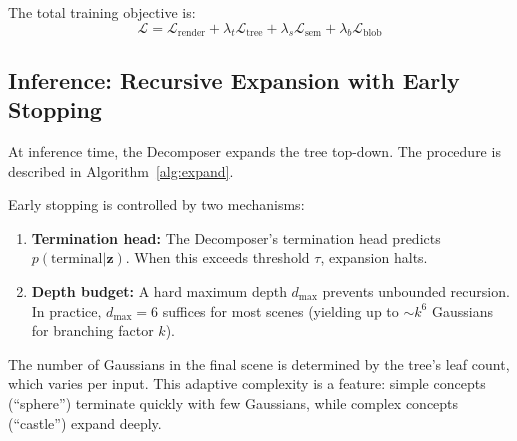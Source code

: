 \documentclass[11pt]{article}
\begin{document}
The total training objective is:
\begin{equation}
\mathcal{L} = \mathcal{L}_{\text{render}} + \lambda_t \mathcal{L}_{\text{tree}} + \lambda_s \mathcal{L}_{\text{sem}} + \lambda_b \mathcal{L}_{\text{blob}}
\end{equation}

\subsection{Inference: Recursive Expansion with Early Stopping}

At inference time, the Decomposer expands the tree top-down. The procedure is described in Algorithm~\ref{alg:expand}.

\begin{algorithm}[ht]
\caption{Recursive Tree Expansion}
\label{alg:expand}
\end{algorithm}

Early stopping is controlled by two mechanisms:

\begin{enumerate}
    \item \textbf{Termination head:} The Decomposer's termination head predicts $p(\text{terminal} | \mathbf{z})$. When this exceeds threshold $\tau$, expansion halts.
    \item \textbf{Depth budget:} A hard maximum depth $d_{\max}$ prevents unbounded recursion. In practice, $d_{\max} = 6$ suffices for most scenes (yielding up to $\sim k^6$ Gaussians for branching factor $k$).
\end{enumerate}

The number of Gaussians in the final scene is determined by the tree's leaf count, which varies per input. This adaptive complexity is a feature: simple concepts (``sphere'') terminate quickly with few Gaussians, while complex concepts (``castle'') expand deeply.
\end{document}
